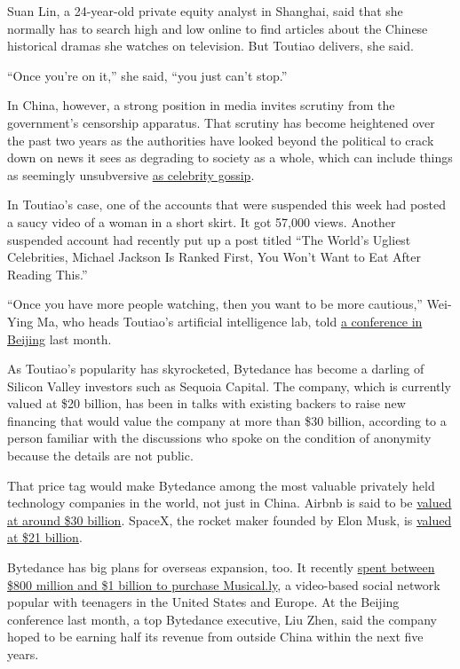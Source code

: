 Suan Lin, a 24-year-old private equity analyst in Shanghai, said that
she normally has to search high and low online to find articles about
the Chinese historical dramas she watches on television. But Toutiao
delivers, she said.

``Once you're on it,'' she said, ``you just can't stop.''

In China, however, a strong position in media invites scrutiny from the
government's censorship apparatus. That scrutiny has become heightened
over the past two years as the authorities have looked beyond the
political to crack down on news it sees as degrading to society as a
whole, which can include things as seemingly unsubversive
\href{https://www.nytimes3xbfgragh.onion/2017/06/09/world/asia/china-celebrity-news-wechat.html}{as
celebrity gossip}.

In Toutiao's case, one of the accounts that were suspended this week had
posted a saucy video of a woman in a short skirt. It got 57,000 views.
Another suspended account had recently put up a post titled ``The
World's Ugliest Celebrities, Michael Jackson Is Ranked First, You Won't
Want to Eat After Reading This.''

``Once you have more people watching, then you want to be more
cautious,'' Wei-Ying Ma, who heads Toutiao's artificial intelligence
lab, told \href{http://aideas.toutiao.com/index.html}{a conference in
Beijing} last month.

As Toutiao's popularity has skyrocketed, Bytedance has become a darling
of Silicon Valley investors such as Sequoia Capital. The company, which
is currently valued at \$20 billion, has been in talks with existing
backers to raise new financing that would value the company at more than
\$30 billion, according to a person familiar with the discussions who
spoke on the condition of anonymity because the details are not public.

That price tag would make Bytedance among the most valuable privately
held technology companies in the world, not just in China. Airbnb is
said to be
\href{https://www.nytimes3xbfgragh.onion/2017/03/09/technology/airbnb-1-billion-funding.html}{valued
at around \$30 billion}. SpaceX, the rocket maker founded by Elon Musk,
is
\href{https://www.nytimes3xbfgragh.onion/2017/07/27/technology/spacex-is-now-one-of-the-worlds-most-valuable-privately-held-companies.html}{valued
at \$21 billion}.

Bytedance has big plans for overseas expansion, too. It recently
\href{https://www.nytimes3xbfgragh.onion/2017/11/10/business/dealbook/musically-sold-app-video.html}{spent
between \$800 million and \$1 billion to purchase Musical.ly}, a
video-based social network popular with teenagers in the United States
and Europe. At the Beijing conference last month, a top Bytedance
executive, Liu Zhen, said the company hoped to be earning half its
revenue from outside China within the next five years.

